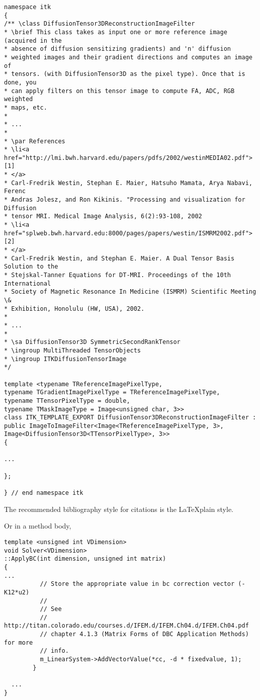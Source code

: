 \small
\begin{verbatim}
namespace itk
{
/** \class DiffusionTensor3DReconstructionImageFilter
* \brief This class takes as input one or more reference image (acquired in the
* absence of diffusion sensitizing gradients) and 'n' diffusion
* weighted images and their gradient directions and computes an image of
* tensors. (with DiffusionTensor3D as the pixel type). Once that is done, you
* can apply filters on this tensor image to compute FA, ADC, RGB weighted
* maps, etc.
*
* ...
*
* \par References
* \li<a href="http://lmi.bwh.harvard.edu/papers/pdfs/2002/westinMEDIA02.pdf">[1]
* </a>
* Carl-Fredrik Westin, Stephan E. Maier, Hatsuho Mamata, Arya Nabavi, Ferenc
* Andras Jolesz, and Ron Kikinis. "Processing and visualization for Diffusion
* tensor MRI. Medical Image Analysis, 6(2):93-108, 2002
* \li<a href="splweb.bwh.harvard.edu:8000/pages/papers/westin/ISMRM2002.pdf">[2]
* </a>
* Carl-Fredrik Westin, and Stephan E. Maier. A Dual Tensor Basis Solution to the
* Stejskal-Tanner Equations for DT-MRI. Proceedings of the 10th International
* Society of Magnetic Resonance In Medicine (ISMRM) Scientific Meeting \&
* Exhibition, Honolulu (HW, USA), 2002.
*
* ...
*
* \sa DiffusionTensor3D SymmetricSecondRankTensor
* \ingroup MultiThreaded TensorObjects
* \ingroup ITKDiffusionTensorImage
*/

template <typename TReferenceImagePixelType,
typename TGradientImagePixelType = TReferenceImagePixelType,
typename TTensorPixelType = double,
typename TMaskImageType = Image<unsigned char, 3>>
class ITK_TEMPLATE_EXPORT DiffusionTensor3DReconstructionImageFilter :
public ImageToImageFilter<Image<TReferenceImagePixelType, 3>,
Image<DiffusionTensor3D<TTensorPixelType>, 3>>
{

...

};

} // end namespace itk
\end{verbatim}
\normalsize

The recommended bibliography style for citations is the \LaTeX plain style.

Or in a method body,

\small
\begin{verbatim}
template <unsigned int VDimension>
void Solver<VDimension>
::ApplyBC(int dimension, unsigned int matrix)
{
...
          // Store the appropriate value in bc correction vector (-K12*u2)
          //
          // See
          // http://titan.colorado.edu/courses.d/IFEM.d/IFEM.Ch04.d/IFEM.Ch04.pdf
          // chapter 4.1.3 (Matrix Forms of DBC Application Methods) for more
          // info.
          m_LinearSystem->AddVectorValue(*cc, -d * fixedvalue, 1);
        }

  ...
}
\end{verbatim}
\normalsize


